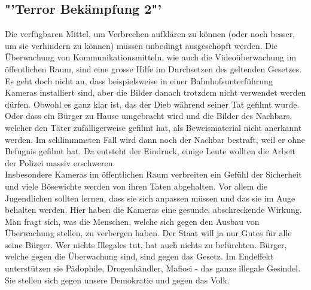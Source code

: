 \subsection*{"'Terror Bekämpfung 2"'}
Die verfügbaren Mittel, um Verbrechen 
aufklären zu können (oder noch besser, um sie verhindern zu können) 
müssen unbedingt ausgeschöpft werden. Die Überwachung von 
Kommunikationsmitteln, wie auch die Videoüberwachung im öffentlichen 
Raum, sind eine grosse Hilfe im Durchsetzen des geltenden Gesetzes. Es 
geht doch nicht an, dass beispielsweise in einer 
Bahnhofsunterführung Kameras installiert sind, aber die Bilder danach 
trotzdem nicht verwendet werden dürfen. Obwohl es ganz klar ist, das 
der Dieb während seiner Tat gefilmt wurde. Oder dass ein B\"urger zu Hause 
umgebracht wird und die Bilder des Nachbars, welcher den Täter 
zufälligerweise gefilmt hat, als Beweismaterial nicht anerkannt werden. 
Im schlimmmsten Fall wird dann noch der Nachbar bestraft, weil er ohne 
Befugnis gefilmt hat. Da entsteht der Eindruck, einige Leute wollten 
die Arbeit der Polizei massiv erschweren.\\
Insbesondere Kameras im öffentlichen Raum verbreiten
ein Gefühl der Sicherheit und viele Bösewichte werden von ihren 
Taten abgehalten. Vor allem die Jugendlichen sollten lernen, dass sie 
sich anpassen müssen und das sie im Auge behalten werden. Hier haben die 
Kameras eine gesunde, abschreckende Wirkung.\\
Man fragt sich, was die Menschen, welche sich gegen den Ausbau von 
Überwachung stellen, zu verbergen haben. Der Staat will ja nur Gutes 
für alle seine B\"urger. Wer nichts Illegales tut, hat auch nichts zu befürchten. 
Bürger, welche gegen die Überwachung sind, sind gegen das Gesetz. Im 
Endeffekt unterstützen sie Pädophile, Drogenhändler, Mafiosi - das 
ganze illegale Gesindel. Sie stellen sich gegen unsere Demokratie und 
gegen das Volk.

